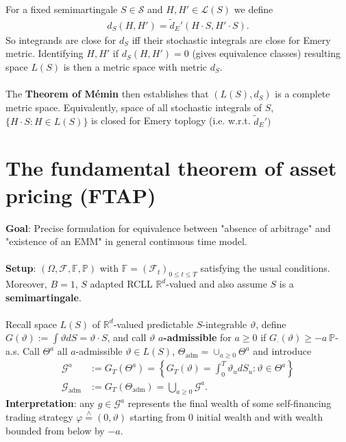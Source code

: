 \documentclass[12pt,a4paper, twoside]{article}
\theoremstyle{definition}
\newcommand{\PP}{\mathbb{P}} %
\newcommand{\teq}{\overset{\wedge}{=}}
\begin{document}
For a fixed semimartingale $S \in \mathcal{S}$ and $H,H' \in \mathcal{L}(S)$ we define 
\begin{align*}
d_S(H,H')=\widetilde{d}_E'(H \cdot S, H' \cdot S).
\end{align*}
So integrands are close for $d_S$ iff their stochastic integrals are close for Emery metric. Identifying $H,H'$ if $d_S(H,H')=0$ (gives equivalence classes) resulting space $L(S)$ is then a metric space with metric $d_S$. 
\\\\
The \textbf{Theorem of Mémin} then establishes that $(L(S),d_S)$ is a complete metric space. Equivalently,  space of all stochastic integrals of $S$, $\{H \cdot S: H \in L(S)\}$ is closed for Emery toplogy (i.e. w.r.t. $\widetilde{d}_E')$
\newpage
\section{The fundamental theorem of asset pricing (FTAP)}
\textbf{Goal}: Precise formulation for equivalence between "absence of arbitrage" and "existence of an EMM" in general continuous time model. 
\\\\
\textbf{Setup}: $( \Omega, \mathcal{F}, \mathbb{F}, \PP)$ with $\mathbb{F}= ( \mathcal{F}_t)_{0 \leq t \leq T}$ satisfying the usual conditions. Moreover, $B=1$, $S$ adapted RCLL $\mathbb{R}^d$-valued and also assume $S$ is a \textbf{semimartingale}.\\
\\
Recall space $L(S)$ of $\mathbb{R}^d$-valued predictable $S$-integrable $\vartheta$, define $G( \vartheta):= \int \vartheta dS = \vartheta \cdot S$, and call $\vartheta$ \textbf{$a$-admissible} for $a \geq 0$ if $G_\cdot ( \vartheta) \geq -a \ \PP$-a.s. Call $\Theta^a$ all $a$-admissible $\vartheta \in L(S)$, $\Theta_\text{adm} = \cup_{a \geq 0 } \Theta^a$ and introduce 
\begin{align*}
\mathcal{G}^a &:= G_T( \Theta^a) = \left\{ G_T( \vartheta) = \int_0^T \vartheta_u dS_u : \vartheta \in \Theta^a \right\} \\
\mathcal{G}_\text{adm}&:= G_T( \Theta_\text{adm}) = \bigcup_{a \geq 0} \mathcal{G}^a.
\end{align*}
\textbf{Interpretation}: any $g \in \mathcal{G}^a$ represents the final wealth of some self-financing trading strategy $\varphi \teq ( 0, \vartheta)$ starting from $0$ initial wealth and with wealth bounded from below by $-a$. 
\\
\\
\end{document}
